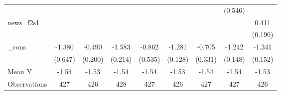 {\begin{tabular}{l*{8}{c}}
            &                     &                     &                     &                     &                     &                     &     (0.546)         &                     \\
\addlinespace
news\_f2s1   &                     &                     &                     &                     &                     &                     &                     &       0.411\sym{**} \\
            &                     &                     &                     &                     &                     &                     &                     &     (0.190)         \\
\addlinespace
\_cons      &      -1.380\sym{**} &      -0.490\sym{**} &      -1.583\sym{***}&      -0.862         &      -1.281\sym{***}&      -0.705\sym{**} &      -1.242\sym{***}&      -1.341\sym{***}\\
            &     (0.647)         &     (0.200)         &     (0.214)         &     (0.535)         &     (0.128)         &     (0.331)         &     (0.148)         &     (0.152)         \\
\midrule
Mean Y      &       -1.54         &       -1.53         &       -1.54         &       -1.54         &       -1.53         &       -1.54         &       -1.54         &       -1.53         \\
Observations&         427         &         426         &         428         &         427         &         426         &         427         &         427         &         426         \\
\bottomrule
\end{tabular}
}
